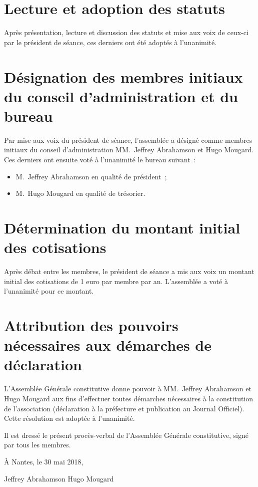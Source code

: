\documentclass[12pt]{article}
\begin{document}
\section{Lecture et adoption des statuts}
\label{sec:lecture-et-adoption-des-statuts}

Après présentation, lecture et discussion des statuts et mise aux voix
de ceux-ci par le président de séance, ces derniers ont été adoptés à
l'unanimité.

\section{Désignation des membres initiaux du conseil d'administration
  et du bureau}
\label{sec:designation-des-membres}

Par mise aux voix du président de séance, l'assemblée a désigné comme
membres initiaux du conseil d'administration MM.~Jeffrey Abrahamson et
Hugo Mougard. Ces derniers ont ensuite voté à l'unanimité le bureau
suivant :

\begin{itemize}
\item M.~Jeffrey Abrahamson en qualité de président ;
\item M.~Hugo Mougard en qualité de trésorier.
\end{itemize}

\section{Détermination du montant initial des cotisations}
\label{sec:determination-du-montant-initial-des-cotisations}

Après débat entre les membres, le président de séance a mis aux voix
un montant initial des cotisations de 1 euro par membre par
an. L'assemblée a voté à l'unanimité pour ce montant.

\section{Attribution des pouvoirs nécessaires aux démarches de déclaration}
\label{sec:attribution-des-pouvoirs-necessaires-aux-demarches-de-declaration}

L'Assemblée Générale constitutive donne pouvoir à MM.~Jeffrey
Abrahamson et Hugo Mougard aux fins d'effectuer toutes démarches
nécessaires à la constitution de l'association (déclaration à la
préfecture et publication au Journal Officiel). Cette résolution est
adoptée à l'unanimité.

\vfill{}

Il est dressé le présent procès-verbal de l'Assemblée Générale
constitutive, signé par tous les membres.

\vspace{2cm}

\begin{flushright}
  À Nantes, le 30 mai 2018,
\end{flushright}

\vspace{2cm}

\hfill{}Jeffrey Abrahamson \hspace{4cm} Hugo Mougard\hfill{}

\vfill
\end{document}
